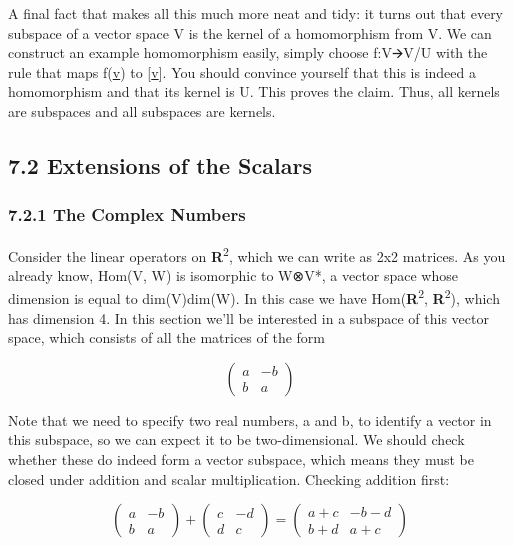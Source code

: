 \documentclass[oneside,english]{amsbook}
\numberwithin{section}{chapter}
\theoremstyle{plain}
\theoremstyle{definition}
\begin{document}
A final fact that makes all this much more neat and tidy: it turns out
that every subspace of a vector space V is the kernel of a homomorphism
from V. We can construct an example homomorphism easily, simply choose
f:V🡪V/U with the rule that maps f(\ul{v}) to {[}\ul{v}{]}. You should
convince yourself that this is indeed a homomorphism and that its kernel
is U. This proves the claim. Thus, all kernels are subspaces and all
subspaces are kernels.

\subsection{7.2 Extensions of the
	Scalars}\label{extensions-of-the-scalars}

\subsubsection{7.2.1 The Complex Numbers}\label{the-complex-numbers}

Consider the linear operators on \textbf{R}\textsuperscript{2}, which we
can write as 2x2 matrices. As you already know, Hom(V, W) is isomorphic
to W⊗V*, a vector space whose dimension is equal to dim(V)dim(W). In
this case we have Hom(\textbf{R}\textsuperscript{2},
\textbf{R}\textsuperscript{2}), which has dimension 4. In this section
we'll be interested in a subspace of this vector space, which consists
of all the matrices of the form

\[\begin{pmatrix}
	a & - b \\
	b & a
\end{pmatrix}\]

Note that we need to specify two real numbers, a and b, to identify a
vector in this subspace, so we can expect it to be two-dimensional. We
should check whether these do indeed form a vector subspace, which means
they must be closed under addition and scalar multiplication. Checking
addition first:

\[\begin{pmatrix}
	a & - b \\
	b & a
\end{pmatrix} + \begin{pmatrix}
	c & - d \\
	d & c
\end{pmatrix} = \begin{pmatrix}
	a + c & - b - d \\
	b + d & a + c
\end{pmatrix}\]
\end{document}
